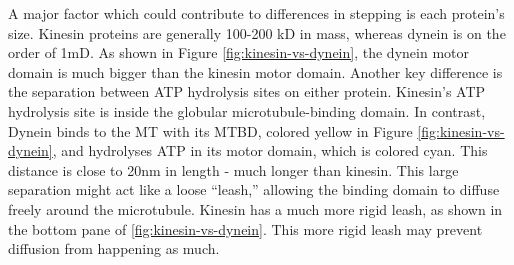 \documentclass[
11pt, %
english, %
singlespacing, %
headsepline, %
chapterinoneline, %
]{MastersDoctoralThesis} %
\begin{document}
A major factor which could contribute to differences in stepping is each protein's size. Kinesin proteins are generally 100-200 kD in mass, whereas dynein is on the order of 1mD. As shown in Figure \ref{fig:kinesin-vs-dynein}, the dynein motor domain is much bigger than the kinesin motor domain. Another key difference is the separation between ATP hydrolysis sites on either protein. Kinesin's ATP hydrolysis site is inside the globular microtubule-binding domain. In contrast, Dynein binds to the MT with its MTBD, colored yellow in Figure \ref{fig:kinesin-vs-dynein}, and hydrolyses ATP in its motor domain, which is colored cyan. This distance is close to 20nm in length - much longer than kinesin. This large separation might act like a loose ``leash,'' allowing the binding domain to diffuse freely around the microtubule. Kinesin has a much more rigid leash, as shown in the bottom pane of \ref{fig:kinesin-vs-dynein}. This more rigid leash may prevent diffusion from happening as much.\\
\end{document}

